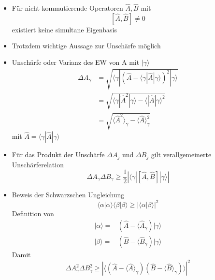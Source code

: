 \documentclass[10pt,article,colorback,accentcolor=tud9d]{scrartcl}
\begin{document}
  \begin{itemize}
    \item Für nicht kommutierende Operatoren $\hat{A},\hat{B}$ mit 
      $$
      \left[\hat{A},\hat{B}\right]\neq 0
      $$
      existiert keine simultane Eigenbasis
    \item Trotzdem wichtige Aussage zur Unschärfe möglich
    \item Unschärfe oder Varianz des EW von A mit $|\gamma\rangle$
      \begin{equation}
      \begin{aligned}
        \Delta A_\gamma&=\sqrt{\langle\gamma|\left(\hat{A}-\langle\gamma\left|\hat{A}\right|\gamma\rangle\right)^2|\gamma\rangle}\\
        &=\sqrt{\langle\gamma\left|\hat{A}^2\right|\gamma\rangle-\langle\left|\hat{A}\right|\gamma\rangle^2}\\
        &=\sqrt{\langle\hat{A}^2\rangle_\gamma-\langle\hat{A}\rangle_\gamma^2}
      \end{aligned}        
      \end{equation}
      mit $\hat{A}=\langle\gamma|\hat{A}|\gamma\rangle$
    \item Für das Produkt der Unschärfe $\Delta A_j$ und $\Delta B_j$ gilt verallgemeinerte Unschärferelation
      \begin{equation}
      \Delta A_\gamma \Delta B_\gamma \geq \frac{1}{2}\left|\langle\gamma\left|\left[ \hat{A},\hat{B}\right]\right|\gamma\rangle\right|
      \end{equation}
    \item Beweis der Schwarzschen Ungleichung
      \begin{equation}
      \langle\alpha|\alpha\rangle\langle\beta|\beta\rangle \geq \left|\langle\alpha\left|\right.\beta\rangle\right|^2
      \end{equation}
      Definition von 
      \begin{equation}
      \begin{aligned}
        |\alpha\rangle=&\left(\hat{A}-\langle\hat{A}_\gamma\right)|\gamma\rangle\\
        |\beta\rangle=&\left(\hat{B}-\langle\hat{B}_\gamma\right)|\gamma\rangle
      \end{aligned}
      \end{equation}
      Damit 
      \begin{equation}
      \Delta A_\gamma^2\Delta B_\gamma^2 \geq \left|\langle \left(\hat{A}-\langle\hat{A}\rangle_\gamma\right)\left(\hat{B}-\langle\hat{B}\rangle_\gamma\right)\rangle\right|^2

\end{equation}
\end{itemize}
\end{document}
